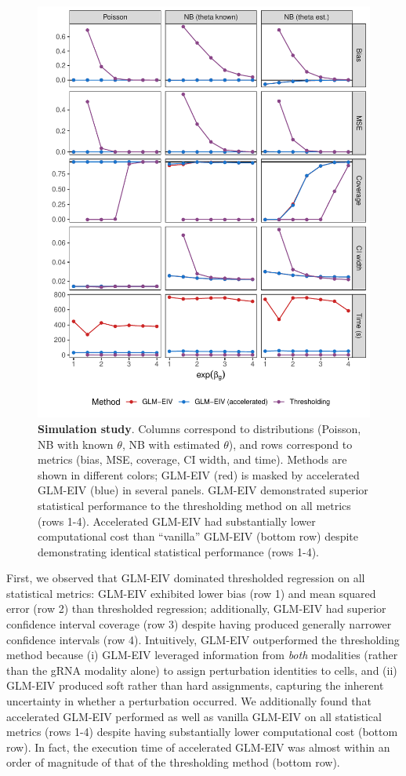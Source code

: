 \documentclass[12pt]{article}
\begin{document}
\begin{figure}[h!]
	\centering
	\includegraphics[width=0.9\linewidth]{figures/main_txt_sim.pdf}
	\caption{\textbf{Simulation study}. Columns correspond to distributions (Poisson, NB with known $\theta$, NB with estimated $\theta$), and rows correspond to metrics (bias, MSE, coverage, CI width, and time). Methods are shown in different colors; GLM-EIV (red) is masked by accelerated GLM-EIV (blue) in several panels. GLM-EIV demonstrated superior statistical performance to the thresholding method on all metrics (rows 1-4). Accelerated GLM-EIV had substantially lower computational cost than ``vanilla'' GLM-EIV (bottom row) despite demonstrating identical statistical performance (rows 1-4).}
	\label{main_text_sim}
\end{figure}

First, we observed that GLM-EIV dominated thresholded regression on all statistical metrics: GLM-EIV exhibited lower bias (row 1) and mean squared error (row 2) than thresholded regression; additionally, GLM-EIV had superior confidence interval coverage (row 3) despite having produced generally narrower confidence intervals (row 4). Intuitively, GLM-EIV outperformed the thresholding method because (i) GLM-EIV leveraged information from \textit{both} modalities (rather than the gRNA modality alone) to assign perturbation identities to cells, and (ii) GLM-EIV produced soft rather than hard assignments, capturing the inherent uncertainty in whether a perturbation occurred. We additionally found that accelerated GLM-EIV performed as well as vanilla GLM-EIV on all statistical metrics (rows 1-4) despite having substantially lower computational cost (bottom row). In fact, the execution time of accelerated GLM-EIV was almost within an order of magnitude of that of the thresholding method (bottom row).
\end{document}
